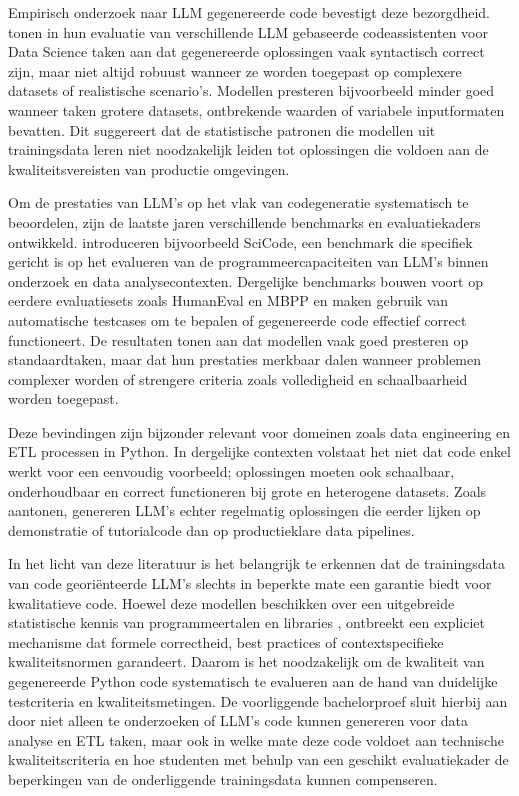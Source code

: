 Empirisch onderzoek naar LLM gegenereerde code bevestigt deze bezorgdheid. \textcite{Nascimento2024} tonen in hun evaluatie van verschillende LLM gebaseerde codeassistenten voor Data Science taken aan dat gegenereerde oplossingen vaak syntactisch correct zijn, maar niet altijd robuust wanneer ze worden toegepast op complexere datasets of realistische scenario’s. Modellen presteren bijvoorbeeld minder goed wanneer taken grotere datasets, ontbrekende waarden of variabele inputformaten bevatten. Dit suggereert dat de statistische patronen die modellen uit trainingsdata leren niet noodzakelijk leiden tot oplossingen die voldoen aan de kwaliteitsvereisten van productie omgevingen.

Om de prestaties van LLM’s op het vlak van codegeneratie systematisch te beoordelen, zijn de laatste jaren verschillende benchmarks en evaluatiekaders ontwikkeld. \textcite{Ni2024} introduceren bijvoorbeeld SciCode, een benchmark die specifiek gericht is op het evalueren van de programmeercapaciteiten van LLM’s binnen onderzoek en data analysecontexten. Dergelijke benchmarks bouwen voort op eerdere evaluatiesets zoals HumanEval en MBPP en maken gebruik van automatische testcases om te bepalen of gegenereerde code effectief correct functioneert. De resultaten tonen aan dat modellen vaak goed presteren op standaardtaken, maar dat hun prestaties merkbaar dalen wanneer problemen complexer worden of  strengere criteria zoals volledigheid en schaalbaarheid worden toegepast.

Deze bevindingen zijn bijzonder relevant voor domeinen zoals data engineering en ETL processen in Python. In dergelijke contexten volstaat het niet dat code enkel werkt voor een eenvoudig voorbeeld; oplossingen moeten ook schaalbaar, onderhoudbaar en correct functioneren bij grote en heterogene datasets. Zoals \textcite{Nascimento2024} aantonen, genereren LLM’s echter regelmatig oplossingen die eerder lijken op demonstratie of tutorialcode dan op productieklare data pipelines.

In het licht van deze literatuur is het belangrijk te erkennen dat de trainingsdata van code georiënteerde LLM’s slechts in beperkte mate een garantie biedt voor kwalitatieve code. Hoewel deze modellen beschikken over een uitgebreide statistische kennis van programmeertalen en libraries \autocite{Li2023}, ontbreekt een expliciet mechanisme dat formele correctheid, best practices of contextspecifieke kwaliteitsnormen garandeert. Daarom is het noodzakelijk om de kwaliteit van gegenereerde Python code systematisch te evalueren aan de hand van duidelijke testcriteria en kwaliteitsmetingen. De voorliggende bachelorproef sluit hierbij aan door niet alleen te onderzoeken of LLM’s code kunnen genereren voor data analyse en ETL taken, maar ook in welke mate deze code voldoet aan technische kwaliteitscriteria en hoe studenten met behulp van een geschikt evaluatiekader de beperkingen van de onderliggende trainingsdata kunnen compenseren.



